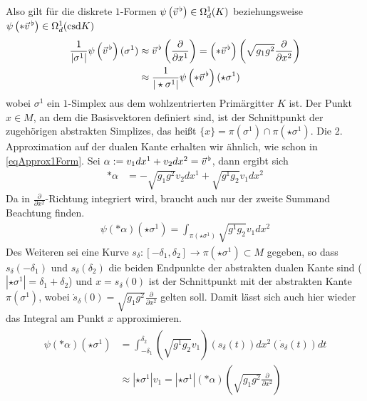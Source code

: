   Also gilt für die diskrete \( 1 \)-Formen \( \psi\left( \vec{v}^{\,\flat} \right) \in \Omega^{1}_{d}(K)\) beziehungsweise
  \( \psi\left( *\vec{v}^{\,\flat} \right) \in \Omega^{1}_{d}(\text{csd} K)\)
  \begin{align}
  \label{eqIntegralMittelStern1Form}
  \begin{aligned}
    \frac{1}{|\sigma^{1}|} \psi\left( \vec{v}^{\,\flat} \right)(\sigma^{1}) 
                      &\approx \vec{v}^{\,\flat}\left( \frac{\partial}{\partial x^{1}} \right)
                       = \left( *\vec{v}^{\,\flat} \right)\left( \sqrt{g_{1}g^{2}} \frac{\partial}{\partial x^{2}} \right)\\
                      &\approx  \frac{1}{|\star\sigma^{1}|} \psi\left( *\vec{v}^{\,\flat} \right)(\star\sigma^{1})
  \end{aligned}
  \end{align}
  wobei \( \sigma^{1} \) ein \( 1 \)-Simplex aus dem wohlzentrierten Primärgitter \( K \) ist.
  Der Punkt \( x\in M \), an dem die Basisvektoren definiert sind, ist der Schnittpunkt der zugehörigen abstrakten Simplizes,
  das heißt \( \{x\} = \pi(\sigma^{1})\cap\pi(\star\sigma^{1}) \).
  Die 2. Approximation auf der dualen Kante erhalten wir ähnlich, wie schon in \eqref{eqApprox1Form}.
  Sei \( \alpha:=v_{1}dx^{1} + v_{2}dx^{2} = \vec{v}^{\,\flat} \), dann ergibt sich
  \begin{align}
    *\alpha &= -\sqrt{g_{1}g^{2}}v_{2}dx^{1} + \sqrt{g^{1}g_{2}}v_{1}dx^{2}
  \end{align}
  Da in \( \frac{\partial}{\partial x^{2}} \)-Richtung integriert wird, braucht auch nur der zweite Summand Beachtung finden.
  \begin{align}
    \psi\left( *\alpha \right)(\star\sigma^{1}) = \int_{\pi(\star\sigma^{1})} \sqrt{g^{1}g_{2}} v_{1} dx^{2}
  \end{align}
  Des Weiteren sei eine Kurve \( s_{\delta}:\left[ -\delta_{1}, \delta_{2} \right] \rightarrow \pi(\star\sigma^{1}) \subset M\) gegeben, so dass
  \( s_{\delta}(-\delta_{1}) \) und \( s_{\delta}(\delta_{2}) \) die beiden Endpunkte der abstrakten dualen Kante sind (\( |\star\sigma^{1}| = \delta_{1}+\delta_{2} \))
  und \( x = s_{\delta}(0) \) ist der 
  Schnittpunkt mit der abstrakten Kante \( \pi(\sigma^{1}) \), wobei \( \dot{s}_{\delta}(0) = \sqrt{g_{1}g^{2}} \frac{\partial}{\partial x^{2}} \) gelten soll.
  Damit lässt sich auch hier wieder das Integral am Punkt \( x \) approximieren.
  \begin{align}
  \begin{aligned}
    \psi\left( *\alpha \right)(\star\sigma^{1}) 
            &= \int_{-\delta_{1}}^{\delta_{2}} \left( \sqrt{g^{1}g_{2}} v_{1} \right)(s_{\delta}(t)) dx^{2}(\dot{s}_{\delta}(t)) dt \\
            &\approx |\star\sigma^{1}|v_{1} = |\star\sigma^{1}|(*\alpha)\left( \sqrt{g_{1}g^{2}} \frac{\partial}{\partial x^{2}}\right)
  \end{aligned}
  \end{align}
  
